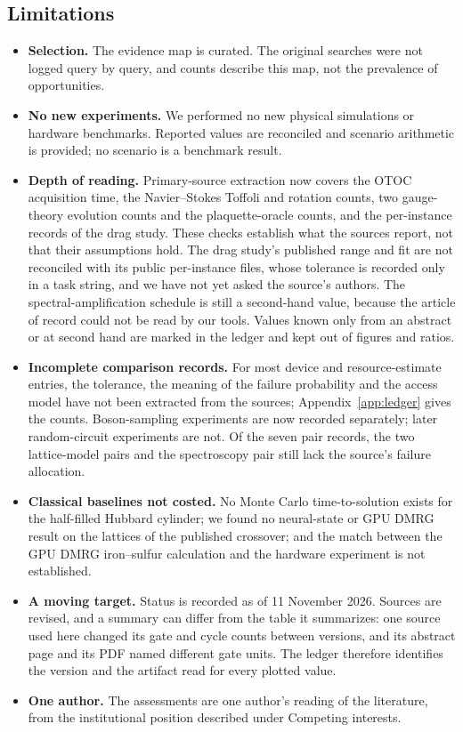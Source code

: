 \documentclass[10pt,a4paper]{article}
\begin{document}
\subsection{Limitations}
\label{sec:limits}
\begin{itemize}
\item \textbf{Selection.} The evidence map is curated. The original searches were not logged query by query, and counts describe this map, not the prevalence of opportunities.
\item \textbf{No new experiments.} We performed no new physical simulations or hardware benchmarks. Reported values are reconciled and scenario arithmetic is provided; no scenario is a benchmark result.
\item \textbf{Depth of reading.} Primary-source extraction now covers the OTOC acquisition time, the Navier--Stokes Toffoli and rotation counts, two gauge-theory evolution counts and the plaquette-oracle counts, and the per-instance records of the drag study. These checks establish what the sources report, not that their assumptions hold. The drag study's published range and fit are not reconciled with its public per-instance files, whose tolerance is recorded only in a task string, and we have not yet asked the source's authors. The spectral-amplification schedule is still a second-hand value, because the article of record could not be read by our tools. Values known only from an abstract or at second hand are marked in the ledger and kept out of figures and ratios.
\item \textbf{Incomplete comparison records.} For most device and resource-estimate entries, the tolerance, the meaning of the failure probability and the access model have not been extracted from the sources; Appendix~\ref{app:ledger} gives the counts. Boson-sampling experiments are now recorded separately; later random-circuit experiments are not. Of the seven pair records, the two lattice-model pairs and the spectroscopy pair still lack the source's failure allocation.
\item \textbf{Classical baselines not costed.} No Monte Carlo time-to-solution exists for the half-filled Hubbard cylinder; we found no neural-state or GPU DMRG result on the lattices of the published crossover; and the match between the GPU DMRG iron--sulfur calculation and the hardware experiment is not established.
\item \textbf{A moving target.} Status is recorded as of 11 November 2026. Sources are revised, and a summary can differ from the table it summarizes: one source used here changed its gate and cycle counts between versions, and its abstract page and its PDF named different gate units. The ledger therefore identifies the version and the artifact read for every plotted value.
\item \textbf{One author.} The assessments are one author's reading of the literature, from the institutional position described under Competing interests.
\end{itemize}
\end{document}
